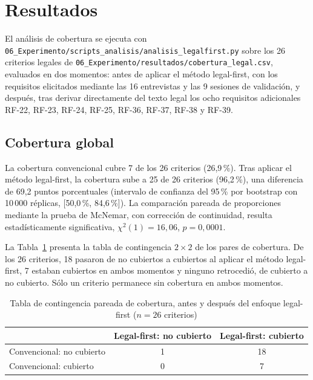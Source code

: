 \documentclass[pdflatex,sn-mathphys-num]{sn-jnl}
\begin{document}
\section{Resultados}\label{sec:resultados}

El an\'alisis de cobertura se ejecuta con \texttt{06\_Experimento/scripts\_analisis/analisis\_legalfirst.py} sobre los 26 criterios legales de \texttt{06\_Experimento/resultados/cobertura\_legal.csv}, evaluados en dos momentos: antes de aplicar el m\'etodo legal-first, con los requisitos elicitados mediante las 16 entrevistas y las 9 sesiones de validaci\'on, y despu\'es, tras derivar directamente del texto legal los ocho requisitos adicionales RF-22, RF-23, RF-24, RF-25, RF-36, RF-37, RF-38 y RF-39.

\subsection{Cobertura global}

La cobertura convencional cubre 7 de los 26 criterios (26,9\,\%). Tras aplicar el m\'etodo legal-first, la cobertura sube a 25 de 26 criterios (96,2\,\%), una diferencia de 69,2 puntos porcentuales (intervalo de confianza del 95\,\% por bootstrap con 10\,000 r\'eplicas, [50,0\,\%, 84,6\,\%]). La comparaci\'on pareada de proporciones mediante la prueba de McNemar, con correcci\'on de continuidad, resulta estad\'isticamente significativa, $\chi^2(1)=16,06$, $p=0,0001$.

La Tabla~\ref{tab:mcnemar} presenta la tabla de contingencia $2\times2$ de los pares de cobertura. De los 26 criterios, 18 pasaron de no cubiertos a cubiertos al aplicar el m\'etodo legal-first, 7 estaban cubiertos en ambos momentos y ninguno retrocedi\'o, de cubierto a no cubierto. S\'olo un criterio permanece sin cobertura en ambos momentos.

\begin{table}[htbp]
\caption{Tabla de contingencia pareada de cobertura, antes y despu\'es del enfoque legal-first ($n=26$ criterios)}\label{tab:mcnemar}
\begin{tabular}{@{}lcc@{}}
\toprule
 & Legal-first: no cubierto & Legal-first: cubierto \\
\midrule
Convencional: no cubierto & 1 & 18 \\
Convencional: cubierto & 0 & 7 \\
\bottomrule
\end{tabular}
\end{table}
\end{document}
